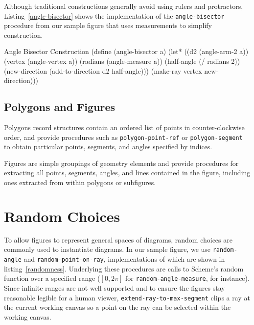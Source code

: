 Although traditional constructions generally avoid using rulers and
protractors, Listing~\ref{angle-bisector} shows the implementation of
the \texttt{angle-bisector} procedure from our sample figure that uses
measurements to simplify construction.

\begin{code-listing}
[label=angle-bisector]
{Angle Bisector Construction}
(define (angle-bisector a)
  (let* ((d2 (angle-arm-2 a))
         (vertex (angle-vertex a))
         (radians (angle-measure a))
         (half-angle (/ radians 2))
         (new-direction (add-to-direction d2 half-angle)))
    (make-ray vertex new-direction)))
\end{code-listing}

\subsection{Polygons and Figures}

Polygons record structures contain an ordered list of points in
counter-clockwise order, and provide procedures such as
\texttt{polygon-point-ref} or \texttt{polygon-segment} to obtain
particular points, segments, and angles specified by indices.

Figures are simple groupings of geometry elements and provide
procedures for extracting all points, segments, angles,
and lines contained in the figure, including ones extracted from within
polygons or subfigures.

\section{Random Choices}

To allow figures to represent general spaces of diagrams, random
choices are commonly used to instantiate diagrams. In our sample
figure, we use \texttt{random-angle} and \texttt{random-point-on-ray},
implementations of which are shown in
listing~\ref{randomness}. Underlying these procedures are
calls to Scheme's random function over a specified range ($[0, 2\pi]$
for \texttt{random-angle-measure}, for instance). Since infinite
ranges are not well supported and to ensure the figures stay
reasonable legible for a human viewer,
\texttt{extend-ray-to-max-segment} clips a ray at the current working
canvas so a point on the ray can be selected within the working
canvas.

